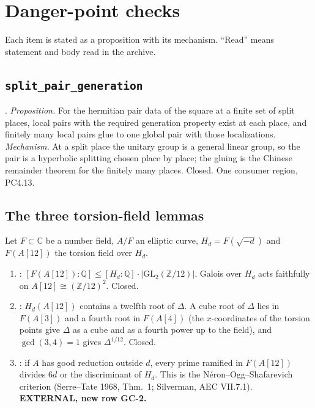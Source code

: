 \documentclass[10pt]{article}
\newcommand{\Q}{\mathbb{Q}}
\newcommand{\Z}{\mathbb{Z}}
\begin{document}
\section{Danger-point checks}\label{sec:danger}

Each item is stated as a proposition with its mechanism. ``Read'' means statement and body read in the archive.

\subsection{\texttt{split\_pair\_generation}}
. \emph{Proposition.} For the hermitian pair data of the square at a finite set of split places, local pairs with the required generation property exist at each place, and finitely many local pairs glue to one global pair with those localizations. \emph{Mechanism.} At a split place the unitary group is a general linear group, so the pair is a hyperbolic splitting chosen place by place; the gluing is the Chinese remainder theorem for the finitely many places. Closed. One consumer region, PC4.13.

\subsection{The three torsion-field lemmas}
Let $F\subset\mathbb C$ be a number field, $A/F$ an elliptic curve, $H_d=F(\sqrt{-d})$ and $F(A[12])$ the torsion field over $H_d$.
\begin{enumerate}[nosep]
\item {}: $[F(A[12]):\Q]\le[H_d:\Q]\cdot\lvert\mathrm{GL}_2(\Z/12)\rvert$. Galois over $H_d$ acts faithfully on $A[12]\cong(\Z/12)^2$. Closed.
\item {}: $H_d(A[12])$ contains a twelfth root of $\Delta$. A cube root of $\Delta$ lies in $F(A[3])$ and a fourth root in $F(A[4])$ (the $x$-coordinates of the torsion points give $\Delta$ as a cube and as a fourth power up to the field), and $\gcd(3,4)=1$ gives $\Delta^{1/12}$. Closed.
\item {}: if $A$ has good reduction outside $d$, every prime ramified in $F(A[12])$ divides $6d$ or the discriminant of $H_d$. This is the N\'eron--Ogg--Shafarevich criterion (Serre--Tate 1968, Thm.~1; Silverman, AEC VII.7.1). \textbf{EXTERNAL, new row GC-2.}
\end{enumerate}
\end{document}
